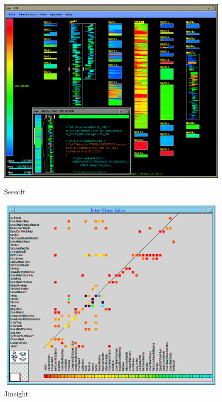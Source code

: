\begin{figure}[ht]
  	\centering
    \includegraphics[width=0.8\linewidth]{Eick1992_Seesoft.png}
    \caption{Seesoft}
    \label{fig:Seesoft}
  \endminipage\hfill
  	\centering
    \includegraphics[width=0.8\linewidth]{DePauw1993_Jinsight.png}
    \caption{Jinsight}
    \label{fig:Jinsight}
  \endminipage\hfill
\end{figure}


